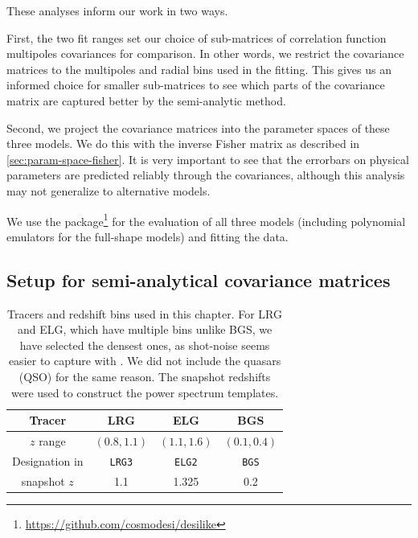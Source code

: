These analyses inform our work in two ways.

First, the two fit ranges set our choice of sub-matrices of correlation function multipoles covariances for comparison.
In other words, we restrict the covariance matrices to the multipoles and radial bins used in the fitting.
This gives us an informed choice for smaller sub-matrices to see which parts of the covariance matrix are captured better by the semi-analytic method.

Second, we project the covariance matrices into the parameter spaces of these three models.
We do this with the inverse Fisher matrix as described in \cref{sec:param-space-fisher}.
It is very important to see that the errorbars on physical parameters are predicted reliably through the \rascalc{} covariances, although this analysis may not generalize to alternative models.

We use the \desilike{} package\footnote{\url{https://github.com/cosmodesi/desilike}} for the evaluation of all three models (including polynomial emulators for the full-shape models) and fitting the data.

\subsection{Setup for semi-analytical covariance matrices}
\label{sec:cov-setup}

\begin{table}[tb]
    \centering
    \begin{tabular}{|c|c|c|c|}
        \hline
        Tracer & LRG & ELG & BGS \\
        \hline
        $z$ range & $(0.8, 1.1)$ & $(1.1, 1.6)$ & $(0.1, 0.4)$ \\
        \hline
        Designation in \cite{DESI2024.II.KP3,DESI2024.III.KP4} & {\tt LRG3} & {\tt ELG2} & {\tt BGS} \\
        \hline
        \ezmocks{} snapshot $z$ & 1.1 & 1.325 & 0.2 \\
        \hline
    \end{tabular}
    \caption[Tracers and redshift bins used in \desimock{} validation]{Tracers and redshift bins used in this chapter.
    For LRG and ELG, which have multiple bins unlike BGS, we have selected the densest ones, as shot-noise seems easier to capture with \rascalc{}.
    We did not include the quasars (QSO) for the same reason.
    The snapshot redshifts were used to construct the power spectrum templates.}
    \label{tab:tracers-bins}
\end{table}

